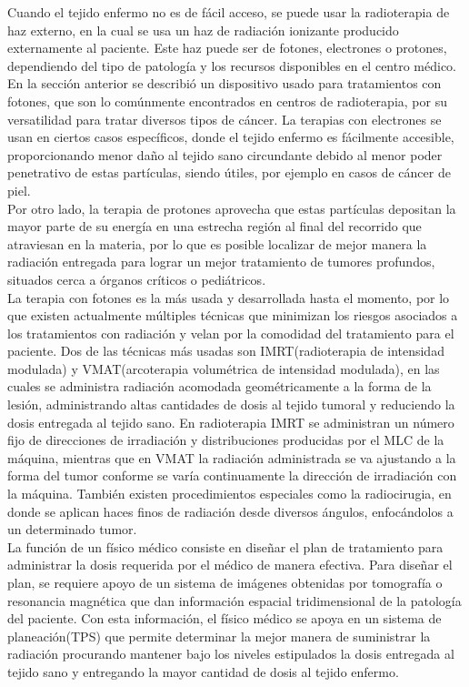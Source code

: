 Cuando el tejido enfermo no es de fácil acceso, se puede usar la radioterapia de haz externo, en la cual se usa un haz de radiación ionizante producido externamente al paciente. Este haz puede ser de fotones, electrones o protones, dependiendo del tipo de patología y los recursos disponibles en el centro médico. En la sección anterior se describió un dispositivo usado para tratamientos con fotones, que son lo comúnmente encontrados en centros de radioterapia, por su versatilidad para tratar diversos tipos de cáncer. La terapias con electrones se usan en ciertos casos específicos, donde el tejido enfermo es fácilmente accesible, proporcionando menor daño al tejido sano circundante debido al menor poder penetrativo de estas partículas, siendo útiles, por ejemplo en casos de cáncer de piel\cite{symonds2019walter}. \\

Por otro lado, la terapia de protones aprovecha que estas partículas depositan la mayor parte de su energía en una estrecha región al final del recorrido que atraviesan en la materia, por lo que es posible localizar de mejor manera la radiación entregada para lograr un mejor tratamiento de tumores profundos, situados cerca a órganos críticos o pediátricos\cite{hadronterapia}.\\

La terapia con fotones es la más usada y desarrollada hasta el momento, por lo que existen actualmente múltiples técnicas que minimizan los riesgos asociados a los tratamientos con radiación y velan por la comodidad del tratamiento para el paciente. Dos de las técnicas más usadas son IMRT(radioterapia de intensidad modulada) y VMAT(arcoterapia volumétrica de intensidad modulada)\cite{Quan2012}, en las cuales se administra radiación acomodada geométricamente a la forma de la lesión, administrando altas cantidades de dosis al tejido tumoral y reduciendo la dosis entregada al tejido sano. En radioterapia IMRT se administran un número fijo de direcciones de irradiación y distribuciones producidas por el MLC de la máquina, mientras que en VMAT la radiación administrada se va ajustando a la forma del tumor conforme se varía continuamente la dirección de irradiación con la máquina. También existen procedimientos especiales como la radiocirugia, en donde se aplican haces finos de radiación desde diversos ángulos, enfocándolos a un determinado tumor.\\



La función de un físico médico consiste en diseñar el plan de tratamiento para administrar la dosis requerida por el médico de manera efectiva. Para diseñar el plan, se requiere apoyo de un sistema de imágenes obtenidas por tomografía o resonancia magnética que dan información espacial tridimensional de la patología del paciente. Con esta información, el físico médico se apoya en un sistema de planeación(TPS) que permite determinar la mejor manera de suministrar la radiación procurando mantener bajo los niveles estipulados la dosis entregada al tejido sano y entregando la mayor cantidad de dosis al tejido enfermo\cite{symonds2019walter}.\\


